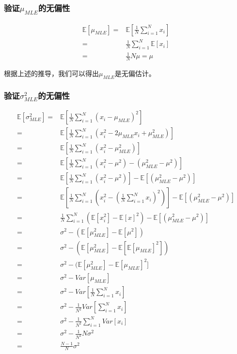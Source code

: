\documentclass[a4paper]{article}
\numberwithin{equation}{section}
\begin{document}
\subsubsection{验证$\mu_{MLE}$的无偏性}

\begin{equation}
    \begin{split}
        \mathbb{E}[\mu_{MLE}] = & \mathbb{E}[\frac{1}{N} \sum_{i=1}^N x_i] \\
        = & \frac{1}{N} \sum_{i=1}^N \mathbb{E}[  x_i] \\
        = & \frac{1}{N} N \mu = \mu
    \end{split}
\end{equation}


根据上述的推导，我们可以得出$\mu_{MLE}$是无偏估计。

\subsubsection{验证$\sigma^2_{MLE}$的无偏性}

\begin{equation}
    \begin{split}
        \mathbb{E}[\sigma^2_{MLE}] = & \mathbb{E}[ \frac{1}{N}\sum_{i=1}^N (x_i-\mu_{MLE})^2] \\
        = & \mathbb{E}[ \frac{1}{N}\sum_{i=1}^N (x_i^2-2\mu_{MLE} x_i + \mu_{MLE}^2)] \\
        = & \mathbb{E}[ \frac{1}{N}\sum_{i=1}^N (x_i^2- \mu_{MLE}^2)]\\
        = & \mathbb{E}[ \frac{1}{N}\sum_{i=1}^N (x_i^2-\mu^2)-(\mu_{MLE}^2-\mu^2)] \\
        = & \mathbb{E}[ \frac{1}{N}\sum_{i=1}^N (x_i^2-\mu^2)]-\mathbb{E}[(\mu_{MLE}^2-\mu^2)]\\
        = & \mathbb{E}[ \frac{1}{N}\sum_{i=1}^N (x_i^2-(\frac{1}{N}\sum_{i=1}^Nx_i)^2)]-\mathbb{E}[(\mu_{MLE}^2-\mu^2)]\\
        = & \frac{1}{N}\sum_{i=1}^{N}(\mathbb{E}[x_i^2]-\mathbb{E}[x]^2)-\mathbb{E}[(\mu_{MLE}^2-\mu^2)] \\
        = & \sigma^2 - (\mathbb{E}[\mu_{MLE}^2] - \mathbb{E}[\mu^2]) \\
        = & \sigma^2 - (\mathbb{E}[\mu_{MLE}^2] - \mathbb{E}[\mathbb{E}[\mu_{MLE}]^2]) \\
        = & \sigma^2 - (\mathbb{E}[\mu_{MLE}^2] - \mathbb{E}[\mu_{MLE}]^2] \\
        = & \sigma^2 - Var[\mu_{MLE}] \\
        = & \sigma^2 - Var[\frac{1}{N}\sum_{i=1}^Nx_i] \\
        = & \sigma^2 - \frac{1}{N^2}Var[\sum_{i=1}^Nx_i] \\
        = & \sigma^2 - \frac{1}{N^2}\sum_{i=1}^NVar[x_i] \\ 
        = & \sigma^2 - \frac{1}{N^2} N \sigma^2 \\
        = & \frac{N-1}{N}\sigma^2
    \end{split}
\end{equation}
\end{document}
